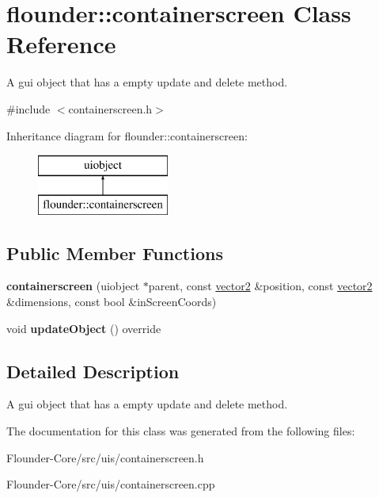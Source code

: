 \hypertarget{classflounder_1_1containerscreen}{}\section{flounder\+:\+:containerscreen Class Reference}
\label{classflounder_1_1containerscreen}


A gui object that has a empty update and delete method.  




{\ttfamily \#include $<$containerscreen.\+h$>$}

Inheritance diagram for flounder\+:\+:containerscreen\+:\begin{figure}[H]
\begin{center}
\leavevmode
\includegraphics[height=2.000000cm]{classflounder_1_1containerscreen}
\end{center}
\end{figure}
\subsection*{Public Member Functions}
\begin{DoxyCompactItemize}
\item 
\mbox{\label{classflounder_1_1containerscreen_a7ba6b3975a5edce6febffcd1650ac86b}} 
{\bfseries containerscreen} (uiobject $\ast$parent, const \hyperlink{classflounder_1_1vector2}{vector2} \&position, const \hyperlink{classflounder_1_1vector2}{vector2} \&dimensions, const bool \&in\+Screen\+Coords)
\item 
\mbox{\label{classflounder_1_1containerscreen_a6ad94c2ef6a63b172dfc1d07596c6bad}} 
void {\bfseries update\+Object} () override
\end{DoxyCompactItemize}


\subsection{Detailed Description}
A gui object that has a empty update and delete method. 



The documentation for this class was generated from the following files\+:\begin{DoxyCompactItemize}
\item 
Flounder-\/\+Core/src/uis/containerscreen.\+h\item 
Flounder-\/\+Core/src/uis/containerscreen.\+cpp\end{DoxyCompactItemize}
